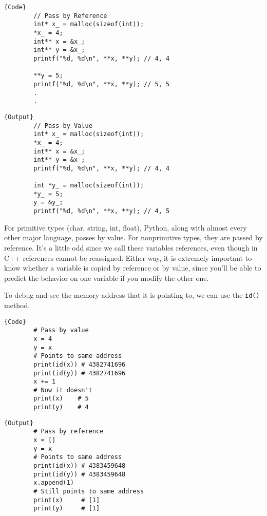 \documentclass{article}
\begin{document}
    \noindent\begin{minipage}{.5\textwidth}
      \begin{lstlisting}[]{Code}
        // Pass by Reference
        int* x_ = malloc(sizeof(int)); 
        *x_ = 4; 
        int** x = &x_; 
        int** y = &x_; 
        printf("%d, %d\n", **x, **y); // 4, 4

        **y = 5; 
        printf("%d, %d\n", **x, **y); // 5, 5
        .
        .
      \end{lstlisting}
      \end{minipage}
      \hfill
      \begin{minipage}{.49\textwidth}
      \begin{lstlisting}[]{Output}
        // Pass by Value
        int* x_ = malloc(sizeof(int)); 
        *x_ = 4; 
        int** x = &x_; 
        int** y = &x_; 
        printf("%d, %d\n", **x, **y); // 4, 4

        int *y_ = malloc(sizeof(int)); 
        *y_ = 5; 
        y = &y_; 
        printf("%d, %d\n", **x, **y); // 4, 5
      \end{lstlisting}
    \end{minipage}
    
    For primitive types (char, string, int, float), Python, along with almost every other major language, passes by value. For nonprimitive types, they are passed by reference. It's a little odd since we call these variables references, even though in C++ references cannot be reassigned. Either way, it is extremely important to know whether a variable is copied by reference or by value, since you'll be able to predict the behavior on one variable if you modify the other one. 

    To debug and see the memory address that it is pointing to, we can use the \texttt{id()} method. 

    \noindent\begin{minipage}{.5\textwidth}
      \begin{lstlisting}[]{Code}
        # Pass by value
        x = 4 
        y = x
        # Points to same address
        print(id(x)) # 4382741696 
        print(id(y)) # 4382741696 
        x += 1 
        # Now it doesn't
        print(x)    # 5
        print(y)    # 4
      \end{lstlisting}
      \end{minipage}
      \hfill
      \begin{minipage}{.49\textwidth}
      \begin{lstlisting}[]{Output}
        # Pass by reference
        x = [] 
        y = x
        # Points to same address 
        print(id(x)) # 4383459648
        print(id(y)) # 4383459648
        x.append(1) 
        # Still points to same address
        print(x)     # [1]
        print(y)     # [1]
      \end{lstlisting}
    \end{minipage}
\end{document}
